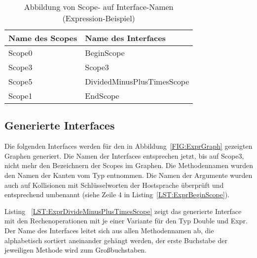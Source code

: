 \documentclass[../InterneDSLs.tex]{subfiles}
\begin{document}
\begin{table}[ht]
\centering
\begin{tabular}{ll}
\textbf{Name des Scopes} & \textbf{Name des Interfaces}\\\hline
Scope0 & BeginScope\\
Scope3 & Scope3\\
Scope5 & DividedMinusPlusTimesScope\\
Scope1 & EndScope\\
\end{tabular}
\caption[Abbildung von Scope- auf Interfacenamen (Expression-Beispiel)]{Abbildung von Scope- auf Interface-Namen (Expression-Beispiel)}
\label{TAB:MappingExpressionScopeToInterface}
\end{table}

\subsection{Generierte Interfaces}
Die folgenden Interfaces werden für den in Abbildung~\ref{FIG:ExprGraph} gezeigten Graphen generiert. Die Namen der Interfaces entsprechen jetzt, bis auf Scope3, nicht mehr den Bezeichnern der Scopes im Graphen. Die Methodennamen wurden den Namen der Kanten vom Typ  entnommen. Die Namen der Argumente wurden auch auf Kollisionen mit Schlüsselworten der Hostsprache überprüft und entsprechend umbenannt (siehe Zeile 4 in Listing~\ref{LST:ExprBeginScope}).
\begin{figure}[ht]
    
\end{figure}

\begin{figure}[ht]

\end{figure}

Listing ~\ref{LST:ExprDivideMinusPlusTimesScope} zeigt das generierte Interface mit den Rechenoperationen mit je einer Variante für den Typ Double und Expr. Der Name des Interfaces leitet sich aus allen Methodennamen ab, die alphabetisch sortiert aneinander gehängt werden, der erste Buchstabe der jeweiligen Methode wird zum Großbuchstaben.
\begin{figure}[ht]
    
\end{figure}
\end{document}
